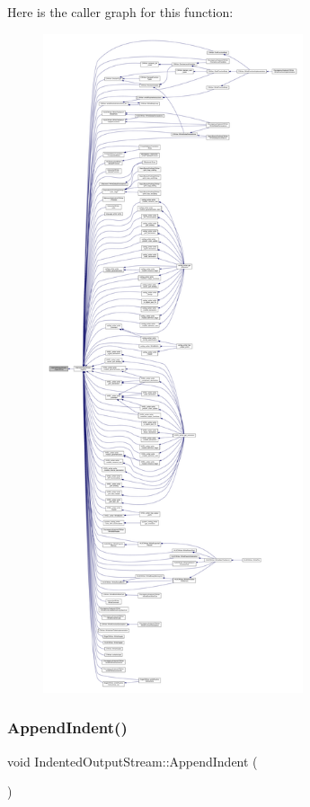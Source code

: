 Here is the caller graph for this function\+:
\nopagebreak
\begin{figure}[H]
\begin{center}
\leavevmode
\includegraphics[height=550pt]{d4/d62/classIndentedOutputStream_aae0d3f029caa08e9ce3b8107ded932b3_icgraph}
\end{center}
\end{figure}
\mbox{\label{classIndentedOutputStream_adeb5dd8a59cf3f5b24809212f6cc286d}} 
\subsubsection{\texorpdfstring{Append\+Indent()}{AppendIndent()}}
{\footnotesize\ttfamily void Indented\+Output\+Stream\+::\+Append\+Indent (\begin{DoxyParamCaption}{ }\end{DoxyParamCaption})\hspace{0.3cm}{\ttfamily [private]}}



